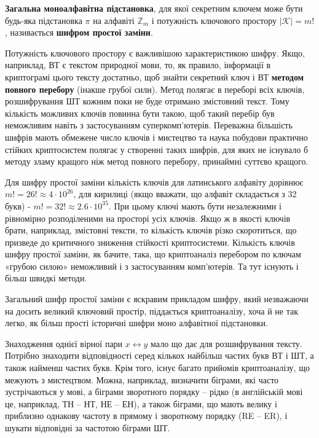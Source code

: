 \begin{definition}
    \textbf{Загальна моноалфавітна підстановка}, для якої
    секретним ключем може бути будь-яка підстановка $\pi$ на алфавіті $\mathbb{Z}_m$ і
    потужність ключового простору $|\mathcal{K}| = m!$, називається \textbf{шифром простої
    заміни}.
\end{definition}

Потужність ключового простору є важливішою характеристикою шифру.
Якщо, наприклад, ВТ є текстом природної мови, то, як правило, інформації в
криптограмі цього тексту достатньо, щоб знайти секретний ключ і ВТ
\textbf{методом повного перебору} (інакше грубої сили). Метод полягає в переборі
всіх ключів, розшифрування ШТ кожним поки не буде отримано змістовний
текст. Тому кількість можливих ключів повинна бути такою, щоб такий
перебір був неможливим навіть з застосуванням суперкомп’ютерів. Переважна
більшість шифрів мають обмежене число ключів і мистецтво та наука
побудови практично стійких криптосистем полягає у створенні таких шифрів,
для яких не існувало б методу зламу кращого ніж метод повного перебору,
принаймні суттєво кращого.

Для шифру простої заміни кількість ключів для латинського алфавіту
дорівнює $m! = 26! \approx 4 \cdot 10^{26}$, для кирилиці (якщо вважати, що алфавіт
складається з 32 букв) - $m! = 32! \approx 2.6 \cdot 10^{35}$. При цьому ключі мають бути
незалежними і рівномірно розподіленими на просторі усіх ключів. Якщо ж в
якості ключів брати, наприклад, змістовні тексти, то кількість ключів різко
скоротиться, що призведе до критичного зниження стійкості криптосистеми.
Кількість ключів шифру простої заміни, як бачите, така, що криптоаналіз
перебором по ключам «грубою силою» неможливий і з застосуванням
комп’ютерів. Та тут існують і більш швидкі методи.

Загальний шифр простої заміни є яскравим прикладом шифру, який
незважаючи на досить великий ключовий простір, піддається криптоаналізу,
хоча й не так легко, як більш прості історичні шифри моно алфавітної
підстановки.

Знаходження однієї вірної пари $x \leftrightarrow y$
мало що дає для розшифрування
тексту. Потрібно знаходити відповідності серед кількох найбільш частих
букв ВТ і ШТ, а також найменш частих букв. Крім того, існує багато
прийомів криптоаналізу, що межують з мистецтвом. Можна, наприклад,
визначити біграми, які часто зустрічаються у мові, а біграми зворотного 
порядку – рідко (в англійській мові це, наприклад, ТН – НТ, НЕ – ЕН), а
також біграми, що мають велику і приблизно однакову частоту в прямому і
зворотному порядку (RE – ER), і шукати відповідні за частотою біграми ШТ.

